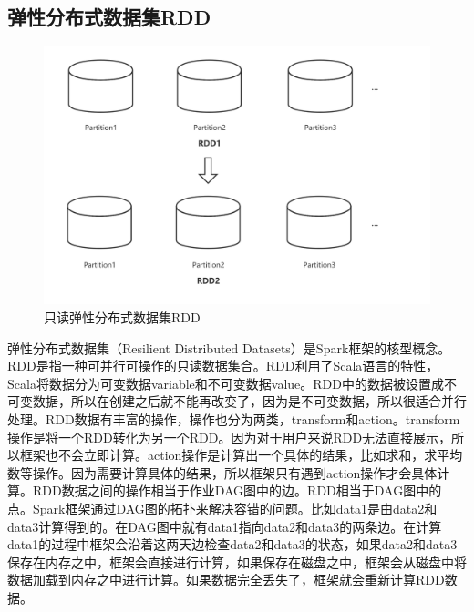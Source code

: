 \subsection{弹性分布式数据集RDD}

\begin{figure}[htbp]
    \centering
    \includegraphics[width=1\textwidth]{Img/RDD示意图.png}
    \caption{只读弹性分布式数据集RDD}
    \label{fig:rdd}
\end{figure}

弹性分布式数据集（Resilient Distributed Datasets）是Spark框架的核型概念。RDD是指一种可并行可操作的只读数据集合。RDD利用了Scala语言的特性，Scala将数据分为可变数据variable和不可变数据value。RDD中的数据被设置成不可变数据，所以在创建之后就不能再改变了，因为是不可变数据，所以很适合并行处理。RDD数据有丰富的操作，操作也分为两类，transform和action。transform操作是将一个RDD转化为另一个RDD。因为对于用户来说RDD无法直接展示，所以框架也不会立即计算。action操作是计算出一个具体的结果，比如求和，求平均数等操作。因为需要计算具体的结果，所以框架只有遇到action操作才会具体计算。RDD数据之间的操作相当于作业DAG图中的边。RDD相当于DAG图中的点。Spark框架通过DAG图的拓扑来解决容错的问题。比如data1是由data2和data3计算得到的。在DAG图中就有data1指向data2和data3的两条边。在计算data1的过程中框架会沿着这两天边检查data2和data3的状态，如果data2和data3保存在内存之中，框架会直接进行计算，如果保存在磁盘之中，框架会从磁盘中将数据加载到内存之中进行计算。如果数据完全丢失了，框架就会重新计算RDD数据。

